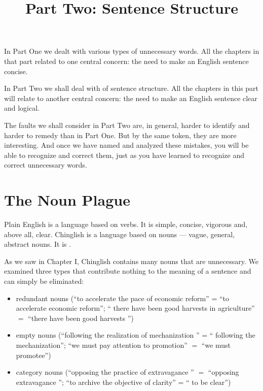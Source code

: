\documentclass{article}
\begin{document}
\title{Part Two: Sentence Structure}
\maketitle

In Part One we dealt with various types of unnecessary words. All the chapters in that part related to one central concern: the need to make an English sentence concise.

In Part Two we shall deal with  of sentence structure. All the chapters in this part will relate to another central concern: the need to make an English sentence clear and logical.

The faults we shall consider in Part Two are, in general, harder to identify and harder to remedy than  in Part One. But by the same token, they are more interesting. And once we have named and analyzed these mistakes, you will be able to recognize and correct them, just as you have learned to recognize and correct unnecessary words.

\section{The Noun Plague}

Plain English is a language based on verbs. It is simple, concise, vigorous and, above all, clear. Chinglish is a language based on nouns --- vague, general, abstract nouns. It is .

As we saw in Chapter I, Chinglish contains many nouns that are unnecessary. We examined three types that contribute nothing to the meaning of a sentence and can simply be eliminated:

\begin{itemize}
  \item redundant nouns (``to accelerate the pace of economic reform'' = ``to accelerate economic reform''; `` there have been good harvests in agriculture'' $=$ ``there have been good harvests '')
  \item empty nouns (``following the realization of mechanization '' = `` following the mechanization''; ``we must pay attention to promotion'' $=$ ``we must promotee'')
  \item category nouns (``opposing the practice of extravagance '' $=$ ``opposing extravagance ''; ``to archive the objective of clarity'' = `` to be clear'')
\end{itemize}
\end{document}
